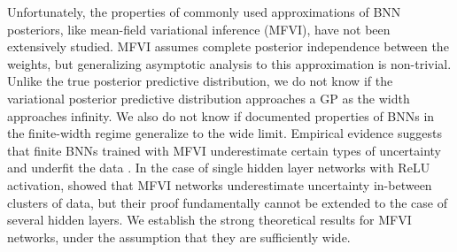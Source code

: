 \documentclass[twoside]{article}
\theoremstyle{theoremstyle}
\begin{document}
Unfortunately, the properties of commonly used approximations of BNN posteriors, like mean-field variational inference (MFVI), have not been extensively studied. MFVI assumes complete posterior independence between the weights, but generalizing asymptotic analysis  to  this  approximation  is  non-trivial. Unlike the true posterior predictive distribution, we do not know if the variational posterior predictive distribution approaches a GP as the width approaches infinity. We also do not know if documented properties of BNNs in the finite-width regime generalize to the wide limit. Empirical evidence suggests that finite BNNs trained with MFVI underestimate certain types of uncertainty \citep{Foong:2019:On_the_Expressiveness_of_Approximate} and underfit the data \citep{tomczak_2021, dusenberry2020efficient}. In the case of single hidden layer networks with ReLU activation, \citep{Foong:2019:On_the_Expressiveness_of_Approximate} showed that MFVI networks underestimate uncertainty in-between clusters of data, but their proof fundamentally cannot be extended to the case of several hidden layers. We establish the strong theoretical results for MFVI networks, under the assumption that they are sufficiently wide. 
\end{document}
